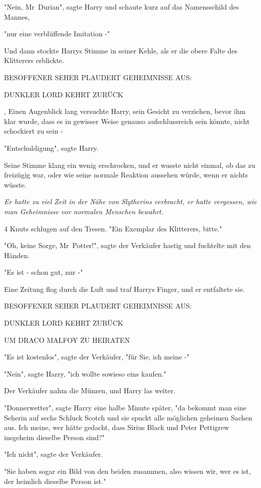 {"Nein, Mr~Durian", sagte Harry und schaute kurz auf das Namensschild des Mannes,

"nur eine verblüffende Imitation -"

Und dann stockte Harrys Stimme in seiner Kehle, als er die obere Falte des Klitterers erblickte.

BESOFFENER SEHER PLAUDERT GEHEIMNISSE AUS:

DUNKLER LORD KEHRT ZURÜCK

, Einen Augenblick lang versuchte Harry, sein Gesicht zu verziehen, bevor ihm klar wurde, dass es in gewisser Weise genauso aufschlussreich sein könnte, nicht schockiert zu sein -

"Entschuldigung", sagte Harry.

Seine Stimme klang ein wenig erschrocken, und er wusste nicht einmal, ob das zu freizügig war, oder wie seine normale Reaktion aussehen würde, wenn er nichts wüsste.

\emph{Er hatte zu viel Zeit in der Nähe von Slytherins verbracht, er hatte vergessen, wie man Geheimnisse vor normalen Menschen bewahrt.}

4 Knuts schlugen auf den Tresen. "Ein Exemplar des Klitterers, bitte."

"Oh, keine Sorge, Mr~Potter!", sagte der Verkäufer hastig und fuchtelte mit den Händen.

"Es ist - schon gut, nur -"

Eine Zeitung flog durch die Luft und traf Harrys Finger, und er entfaltete sie.

BESOFFENER SEHER PLAUDERT GEHEIMNISSE AUS:

DUNKLER LORD KEHRT ZURÜCK

UM DRACO MALFOY ZU HEIRATEN

"Es ist kostenlos", sagte der Verkäufer, "für Sie, ich meine -"

"Nein", sagte Harry, "ich wollte sowieso eins kaufen."

Der Verkäufer nahm die Münzen, und Harry las weiter.

"Donnerwetter", sagte Harry eine halbe Minute später, "da bekommt man eine Seherin auf sechs Schluck Scotch und sie spuckt alle möglichen geheimen Sachen aus. Ich meine, wer hätte gedacht, dass Sirius Black und Peter Pettigrew insgeheim dieselbe Person sind?"

"Ich nicht", sagte der Verkäufer.

"Sie haben sogar ein Bild von den beiden zusammen, also wissen wir, wer es ist, der heimlich dieselbe Person ist."

}
